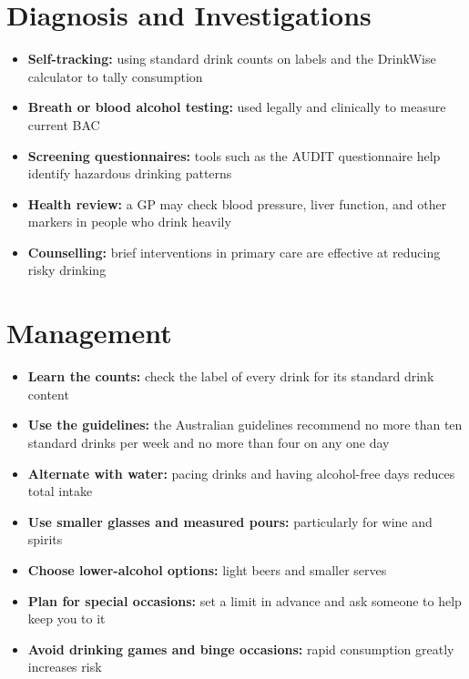 \section*{Diagnosis and Investigations}
\begin{itemize}
    \item \textbf{Self-tracking:} using standard drink counts on labels and the DrinkWise calculator to tally consumption
    \item \textbf{Breath or blood alcohol testing:} used legally and clinically to measure current BAC
    \item \textbf{Screening questionnaires:} tools such as the AUDIT questionnaire help identify hazardous drinking patterns
    \item \textbf{Health review:} a GP may check blood pressure, liver function, and other markers in people who drink heavily
    \item \textbf{Counselling:} brief interventions in primary care are effective at reducing risky drinking
\end{itemize}

\section*{Management}
\begin{itemize}
    \item \textbf{Learn the counts:} check the label of every drink for its standard drink content
    \item \textbf{Use the guidelines:} the Australian guidelines recommend no more than ten standard drinks per week and no more than four on any one day
    \item \textbf{Alternate with water:} pacing drinks and having alcohol-free days reduces total intake
    \item \textbf{Use smaller glasses and measured pours:} particularly for wine and spirits
    \item \textbf{Choose lower-alcohol options:} light beers and smaller serves
    \item \textbf{Plan for special occasions:} set a limit in advance and ask someone to help keep you to it
    \item \textbf{Avoid drinking games and binge occasions:} rapid consumption greatly increases risk
\end{itemize}

